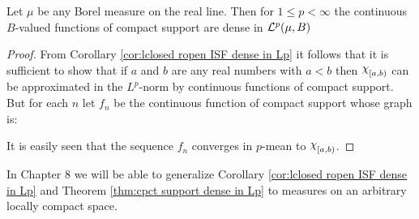 \begin{theorem}\label{thm:cpct support dense in Lp}
Let $\mu$ be any Borel measure on the real line. Then for $1\leq p<\infty$ the continuous $B$-valued functions of compact support are dense in ${\cal L}^p(\mu, B)$
\end{theorem}

\begin{proof}
From Corollary \ref{cor:lclosed ropen ISF dense in Lp} it follows that it is sufficient to show that if $a$ and $b$ are any real numbers with $a<b$ then $\idf{[a, b)}$ can be approximated in the $L^p$-norm by continuous functions of compact support. But for each $n$ let $f_n$ be the continuous function of compact support whose graph is:
\begin{center}
\end{center}
It is easily seen that the sequence $f_n$ converges in $p$-mean to $\idf{[a, b)}$.
\end{proof}

In Chapter 8 we will be able to generalize Corollary \ref{cor:lclosed ropen ISF dense in Lp} and Theorem \ref{thm:cpct support dense in Lp} to measures on an arbitrary locally compact space.